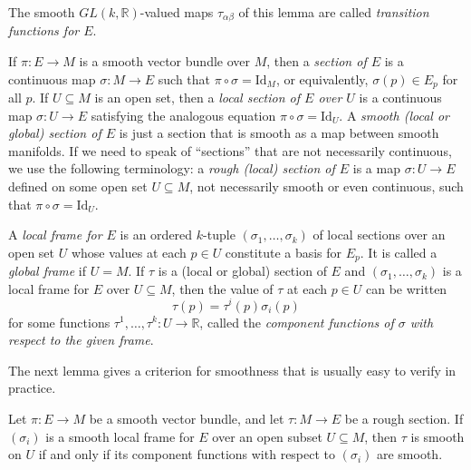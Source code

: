 The smooth $GL(k, \mathbb{R})$-valued maps $\tau_{\alpha\beta}$ of this lemma are called \textit{transition functions for $E$}.

If $\pi: E \to M$ is a smooth vector bundle over $M$, then a \textit{section of $E$} is a continuous map $\sigma: M \to E$ such that $\pi \circ \sigma = \text{Id}_M$, or equivalently, $\sigma(p) \in E_p$ for all $p$. If $U \subseteq M$ is an open set, then a \textit{local section of $E$ over $U$} is a continuous map $\sigma: U \to E$ satisfying the analogous equation $\pi \circ \sigma = \text{Id}_U$. A \textit{smooth (local or global) section of $E$} is just a section that is smooth as a map between smooth manifolds. If we need to speak of ``sections'' that are not necessarily continuous, we use the following terminology: a \textit{rough (local) section of $E$} is a map $\sigma: U \to E$ defined on some open set $U \subseteq M$, not necessarily smooth or even continuous, such that $\pi \circ \sigma = \text{Id}_U$.

A \textit{local frame for $E$} is an ordered $k$-tuple $(\sigma_1, \ldots, \sigma_k)$ of local sections over an open set $U$ whose values at each $p \in U$ constitute a basis for $E_p$. It is called a \textit{global frame} if $U = M$. If $\tau$ is a (local or global) section of $E$ and $(\sigma_1, \ldots, \sigma_k)$ is a local frame for $E$ over $U \subseteq M$, then the value of $\tau$ at each $p \in U$ can be written
\begin{equation*}
\tau(p) = \tau^i(p)\sigma_i(p)
\end{equation*}
for some functions $\tau^1, \ldots, \tau^k: U \to \mathbb{R}$, called the \textit{component functions of $\sigma$ with respect to the given frame}.

The next lemma gives a criterion for smoothness that is usually easy to verify in practice.

\begin{lemma}
\label{lem:local-frame-criterion-for-smoothness}




Let $\pi: E \to M$ be a smooth vector bundle, and let $\tau: M \to E$ be a rough section. If $(\sigma_i)$ is a smooth local frame for $E$ over an open subset $U \subseteq M$, then $\tau$ is smooth on $U$ if and only if its component functions with respect to $(\sigma_i)$ are smooth.
\end{lemma}

